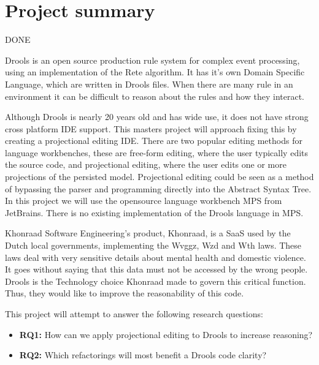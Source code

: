 \section{Project summary}
{\LARGE DONE}

Drools is an open source production rule system for complex event processing, using an implementation of the Rete algorithm.
It has it's own Domain Specific Language, which are written in Drools files.
When there are many rule in an environment it can be difficult to reason about the rules and how they interact.


Although Drools is nearly 20 years old and has wide use, it does not have strong cross platform IDE support.
This masters project will approach fixing this by creating a projectional editing IDE.
There are two popular editing methods for language workbenches, these are free-form editing, where the user typically edits the source code, and projectional editing,
where the user edits one or more projections of the persisted model\cite{erdweg2013state}.
Projectional editing could be seen as a method of bypassing the parser and programming directly into the Abstract Syntax Tree.
In this project we will use the opensource language workbench MPS from JetBrains\cite{MPS_ProductPage}.
There is no existing implementation of the Drools language in MPS.


Khonraad Software Engineering's product, Khonraad, is a SaaS used by the Dutch local governments, implementing the Wvggz, Wzd and Wth laws. 
These laws deal with very sensitive details about mental health and domestic violence.
It goes without saying that this data must not be accessed by the wrong people.
Drools is the Technology choice Khonraad made to govern this critical function.
Thus, they would like to improve the reasonability of this code.



This project will attempt to answer the following research questions:
\begin{itemize}
    \item \textbf{RQ1:} How can we apply projectional editing to Drools to increase reasoning?  
    \item \textbf{RQ2:} Which refactorings will most benefit a Drools code clarity?
\end{itemize}